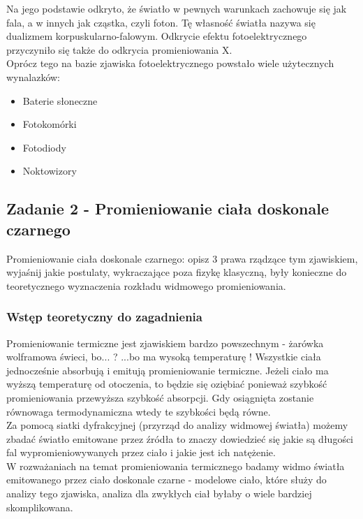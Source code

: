 \documentclass[a4paper,15pt]{article}
\newcommand{\issue}[2]{
    \begin{tcolorbox}[colback=issueColor!5!white,colframe=issueColor,title={Zagadnienie #1}]
        #2
    \end{tcolorbox}
}
\begin{document}
Na jego podstawie odkryto, że światło w pewnych warunkach zachowuje się jak fala, a w innych jak cząstka, czyli foton. Tę własność światła nazywa się dualizmem korpuskularno-falowym. Odkrycie efektu fotoelektrycznego przyczyniło się także do odkrycia promieniowania X. 
\\

Oprócz tego na bazie zjawiska fotoelektrycznego powstało wiele użytecznych wynalazków:
\begin{itemize}
\item Baterie słoneczne
\item Fotokomórki
\item Fotodiody
\item Noktowizory
\end{itemize}



\newpage
\subsection{Zadanie 2 - Promieniowanie ciała doskonale czarnego}

\issue{}{
Promieniowanie ciała doskonale czarnego: opisz 3 prawa rządzące tym zjawiskiem, wyjaśnij jakie postulaty, wykraczające poza fizykę klasyczną, były konieczne do teoretycznego wyznaczenia rozkładu widmowego promieniowania.
}

\subsubsection{Wstęp teoretyczny do zagadnienia}
Promieniowanie termiczne jest zjawiskiem bardzo powszechnym - żarówka wolframowa świeci, bo... ?  ...bo ma wysoką temperaturę ! Wszystkie ciała jednocześnie absorbują i emitują promieniowanie termiczne. Jeżeli ciało ma wyższą temperaturę od otoczenia, to będzie się oziębiać ponieważ szybkość promieniowania przewyższa szybkość absorpcji. Gdy osiągnięta zostanie równowaga termodynamiczna wtedy te szybkości będą równe. \\

Za pomocą siatki dyfrakcyjnej (przyrząd do analizy widmowej światła) możemy zbadać światło emitowane przez źródła to znaczy dowiedzieć się jakie są długości fal wypromieniowywanych przez ciało i jakie jest ich natężenie. \\

W rozważaniach na temat promieniowania termicznego badamy widmo światła emitowanego przez ciało doskonale czarne - modelowe ciało, które służy do analizy tego zjawiska, analiza dla zwykłych ciał byłaby o wiele bardziej skomplikowana. \\ 
\end{document}
